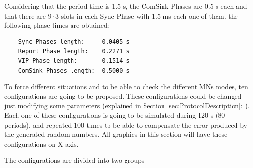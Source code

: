 Considering that the period time is 1.5 s, the ComSink Phases are 0.5 s each and that there are $9\cdot3$ slots in each Sync Phase with 
1.5 ms each one of them, the following phase times are obtained:

\begin{verbatim}
    Sync Phases length:     0.0405 s
    Report Phase length:    0.2271 s
    VIP Phase length:       0.1514 s
    ComSink Phases length:  0.5000 s
\end{verbatim}

To force different situations and to be able to check the different \acp{MN} modes, ten configurations are going to be proposed. These 
configurations could be changed just modifying some parameters (explained in Section \ref{sec:ProtocolDescription}: ). 
Each one of these configurations is going to be simulated during 120 s (80 periods), and repeated 100 times to be able to compensate the error 
produced by the generated random numbers. All graphics in this section will have these configurations on X axis.

The configurations are divided into two groups:

